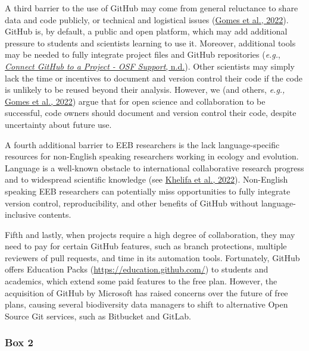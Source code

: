 A third barrier to the use of GitHub may come from general reluctance to share data and code publicly, or technical and logistical issues (\protect\hyperlink{ref-VDJput1V}{Gomes et al., 2022}).
GitHub is, by default, a public and open platform, which may add additional pressure to students and scientists learning to use it.
Moreover, additional tools may be needed to fully integrate project files and GitHub repositories (\emph{e.g.}, \protect\hyperlink{ref-lx49NGto}{\emph{Connect GitHub to a Project - OSF Support}, n.d.}).
Other scientists may simply lack the time or incentives to document and version control their code if the code is unlikely to be reused beyond their analysis.
However, we (and others, \emph{e.g.,} \protect\hyperlink{ref-VDJput1V}{Gomes et al., 2022}) argue that for open science and collaboration to be successful, code owners should document and version control their code, despite uncertainty about future use.

A fourth additional barrier to EEB researchers is the lack language-specific resources for non-English speaking researchers working in ecology and evolution.
Language is a well-known obstacle to international collaborative research progress and to widespread scientific knowledge (see \protect\hyperlink{ref-cW7vGddM}{Khelifa et al., 2022}).
Non-English speaking EEB researchers can potentially miss opportunities to fully integrate version control, reproducibility, and other benefits of GitHub without language-inclusive contents.

Fifth and lastly, when projects require a high degree of collaboration, they may need to pay for certain GitHub features, such as branch protections, multiple reviewers of pull requests, and time in its automation tools.
Fortunately, GitHub offers Education Packs (\url{https://education.github.com/}) to students and academics, which extend some paid features to the free plan.
However, the acquisition of GitHub by Microsoft has raised concerns over the future of free plans, causing several biodiversity data managers to shift to alternative Open Source Git services, such as Bitbucket and GitLab.

\hypertarget{tips}{%
\subsubsection{Box 2}\label{tips}}

